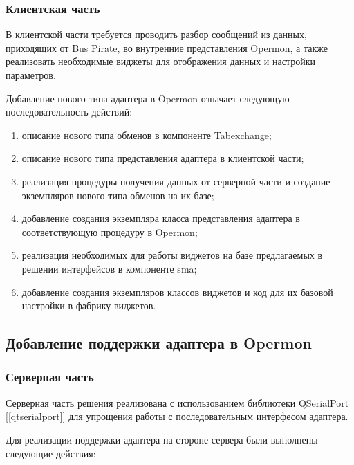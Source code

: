 \subsubsection{Клиентская часть}

В клиентской части требуется проводить разбор сообщений из данных, приходящих от Bus Pirate, во внутренние представления Opermon, а также реализовать необходимые виджеты для отображения данных и настройки параметров. 

Добавление нового типа адаптера в Opermon означает следующую последовательность действий:

\begin{enumerate}
 \item описание нового типа обменов в компоненте Tabexchange;
 \item описание нового типа представления адаптера в клиентской части;
 \item реализация процедуры получения данных от серверной части и создание экземпляров нового типа обменов на их базе;
 \item добавление создания экземпляра класса представления адаптера в соответствующую процедуру в Opermon;
 \item реализация необходимых для работы виджетов на базе предлагаемых в решении интерфейсов в компоненте sma;
 \item добавление создания экземпляров классов виджетов и код для их базовой настройки в фабрику виджетов.
\end{enumerate}


\subsection{Добавление поддержки адаптера в Opermon}

\subsubsection{Серверная часть}

\label{server_implementation}

Серверная часть решения реализована с использованием библиотеки QSerialPort [\ref{qtserialport}] для упрощения работы с последовательным интерфесом адаптера.

Для реализации поддержки адаптера на стороне сервера были выполнены следующие действия:

